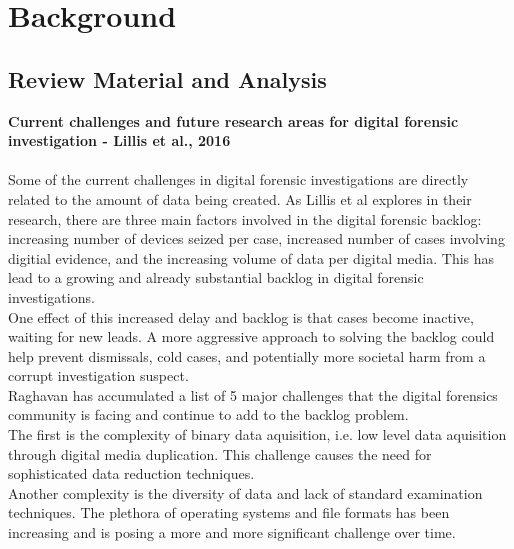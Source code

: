 \documentclass[12pt]{article}
\begin{document}
\newpage
\section{Background}
\label{sect-background}

\subsection{Review Material and Analysis}

\vspace{0.5 cm}
\textbf{Current challenges and future research areas for digital forensic investigation - Lillis et al., 2016 \cite{lillis2016current}}\\
\\

Some of the current challenges in digital forensic investigations are directly related to the amount of data being
created.  As Lillis et al\cite{lillis2016current} explores in their research, there are three main factors
involved in the digital forensic backlog: increasing number of devices seized per case, increased number of cases
involving digitial evidence, and the increasing volume of data per digital media.  This has lead to a growing
and already substantial backlog in digital forensic investigations.\\

One effect of this increased delay and backlog is that cases become inactive, waiting for new leads.  A more
aggressive approach to solving the backlog could help prevent dismissals, cold cases, and potentially more
societal harm from a corrupt investigation suspect.\\

Raghavan\cite{raghavan2013digital} has accumulated a list of 5 major challenges that the digital forensics 
community is facing and continue to add to the backlog problem.\\

The first is the complexity of binary data aquisition, i.e. low level data aquisition through digital media
duplication.  This challenge causes the need for sophisticated data reduction techniques.\\

Another complexity is the diversity of data and lack of standard examination techniques.  The plethora of
operating systems and file formats has been increasing and is posing a more and more significant challenge
over time.\\
\end{document}
